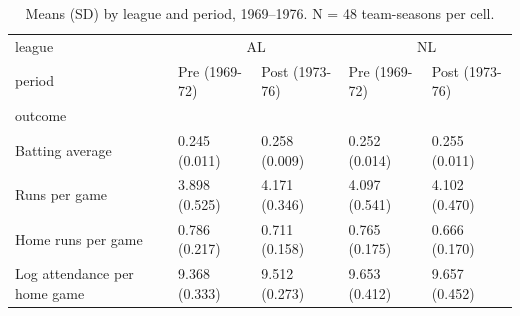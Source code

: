 \begin{table}
\caption{Means (SD) by league and period, 1969--1976. N = 48 team-seasons per cell.}
\label{tab:summary}
\begin{tabular}{lllll}
\toprule
league & \multicolumn{2}{c}{AL} & \multicolumn{2}{c}{NL} \\
period & Pre (1969-72) & Post (1973-76) & Pre (1969-72) & Post (1973-76) \\
outcome &  &  &  &  \\
\midrule
Batting average & 0.245 (0.011) & 0.258 (0.009) & 0.252 (0.014) & 0.255 (0.011) \\
Runs per game & 3.898 (0.525) & 4.171 (0.346) & 4.097 (0.541) & 4.102 (0.470) \\
Home runs per game & 0.786 (0.217) & 0.711 (0.158) & 0.765 (0.175) & 0.666 (0.170) \\
Log attendance per home game & 9.368 (0.333) & 9.512 (0.273) & 9.653 (0.412) & 9.657 (0.452) \\
\bottomrule
\end{tabular}
\end{table}
